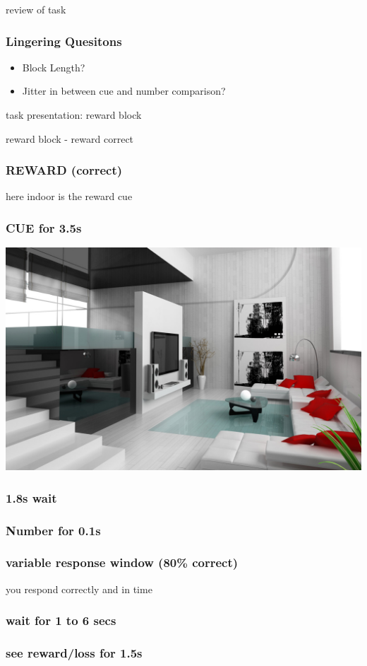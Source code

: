 \documentclass{beamer}
\begin{document}
\begin{section}{review of task}
\begin{frame}
\frametitle{Lingering Quesitons}
	\begin{itemize}
		\item Block Length?
		\item Jitter in between cue and number comparison?
	\end{itemize}
\end{frame}
\end{section}
\begin{section}{task presentation: reward block}
\begin{subsection}{reward block - reward correct}
\begin{frame} \frametitle{REWARD (correct)} here indoor is the reward cue \end{frame}
\begin{frame} \frametitle{CUE for 3.5s}
   \begin{center}
	\includegraphics[width=.5\textwidth]{../imgs/Scenes/Indoors/living-room-interior-design.jpg} \\
   \end{center}
\end{frame}

\begin{frame} \frametitle{1.8s wait} \end{frame}
\begin{frame} \frametitle{Number for 0.1s}  \end{frame}
\begin{frame} \frametitle{variable response window (80\% correct)} \tiny{you respond correctly and in time} \end{frame}
\begin{frame} \frametitle{wait for 1 to 6 secs} \end{frame}
\begin{frame} 
 \frametitle{see reward/loss for 1.5s}
   \begin{center}
     \center{\textcolor{green}{\huge{$\uparrow$}}}
   \end{center}
\end{frame}
\end{subsection}



\end{section}
\end{document}

